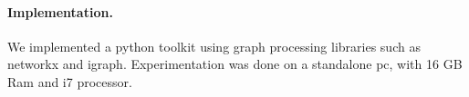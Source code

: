 \paragraph{Implementation. } We implemented a python toolkit using graph processing libraries such as
networkx and igraph. Experimentation was done on a standalone pc, with 16 GB
Ram and i7 processor. 





